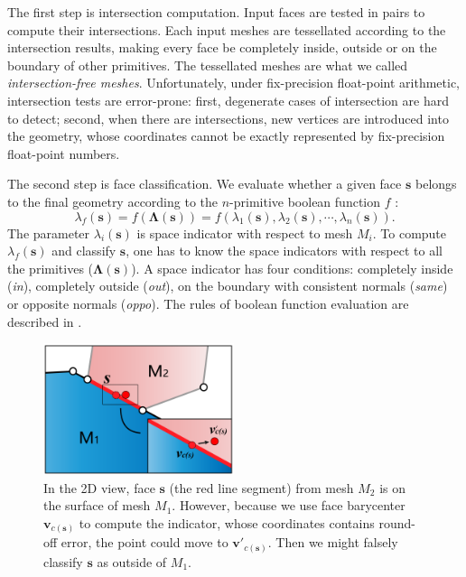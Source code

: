 \documentclass[10pt,journal,compsoc]{IEEEtran}
\begin{document}
The first step is intersection computation. Input faces are tested in pairs to compute their intersections. Each input meshes are tessellated according to the intersection results, making every face be completely inside, outside or on the boundary of other primitives. The tessellated meshes are what we called \emph{intersection-free meshes}. Unfortunately, under fix-precision float-point arithmetic, intersection tests are error-prone: first, degenerate cases of intersection are hard to detect; second, when there are intersections, new vertices are introduced into the geometry, whose coordinates cannot be exactly represented by fix-precision float-point numbers.

The second step is face classification. We evaluate whether a given face $\bm{s}$ belongs to the final geometry according to the $n$-primitive boolean function $f$ :
\begin{equation}
\lambda_f(\bm{s}) = f(\boldsymbol{\Lambda}(\bm{s})) = f(\lambda_1(\bm{s}), \lambda_2(\bm{s}), \cdots, \lambda_n(\bm{s})).
\end{equation}
The parameter $\lambda_i(\bm{s})$ is space indicator with respect to mesh $M_i$. To compute $\lambda_f(\bm{s})$ and classify $\bm{s}$, one has to know the space indicators with respect to all the primitives ($\boldsymbol{\Lambda}(\bm{s})$). A space indicator has four conditions: completely inside (\emph{in}), completely outside (\emph{out}), on the boundary with consistent normals (\emph{same}) or opposite normals (\emph{oppo}). The rules of boolean function evaluation are described in \cite{douze2015quickcsg,feito2013fast}.

\begin{figure}[t]
\centering
\includegraphics[width=2.2in]{boolean-01}
\caption{In the 2D view, face $\bm{s}$ (the red line segment) from mesh $M_2$ is on the surface of mesh $M_1$. However, because we use face barycenter $\bm{v}_{c(\bm{s})}$ to compute the indicator, whose coordinates contains round-off error, the point could  move to $\bm{v'}_{c(\bm{s})}$. Then we might falsely classify $\bm{s}$ as outside of $M_1$.}
\label{fig:falseclass}
\end{figure}
\end{document}
